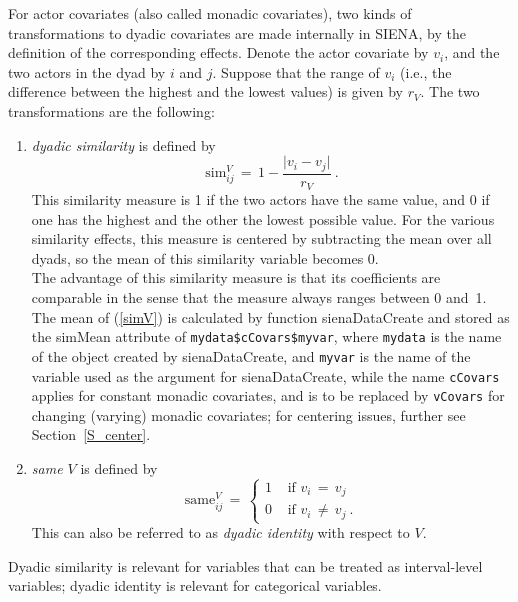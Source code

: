 \documentclass[a4paper,fleqn,11pt]{article}
\newcommand{\+}{\, + \,}
\newcommand{\sfn}[1]{\textsf{#1}}
\newcommand{\si}{{\sf SIENA}}
\begin{document}
For actor covariates (also called monadic covariates),
two kinds of transformations to dyadic covariates
are made internally in \si, by the definition of the
corresponding effects. Denote the actor covariate by $v_i$,
and the two actors in the dyad by $i$ and $j$.
Suppose that the range of $v_i$ (i.e., the difference between the
highest and the lowest values) is given by $r_V$.
The two transformations are the following:
\begin{enumerate}
\item \emph{dyadic similarity} is defined by
\begin{equation}
 \text{sim}^V_{ij} \,=\, 1 - \frac{ \vert v_i - v_j \vert }{ r_V } \ .
            \label{simV}
\end{equation}
      This similarity measure is 1 if
      the two actors have the same value, and 0 if one has the highest and the
      other the lowest possible value.
      For the various similarity effects, this measure
      is centered by subtracting the mean over all dyads,
      so the mean of this similarity variable becomes 0.    \\
      The advantage of this similarity measure is that its coefficients
      are comparable in the sense that the measure always ranges
      between 0 and~1.  \\
      The mean of (\ref{simV}) is calculated by function
      \sfn{sienaDataCreate} and stored as the \sfn{simMean} attribute
      of \texttt{mydata\$cCovars\$myvar}, where \texttt{mydata} is the name
      of the object created by \sfn{sienaDataCreate}, and \texttt{myvar}
      is the name of the variable used as the argument for
      \sfn{sienaDataCreate}, while the name \texttt{cCovars} applies for
      constant monadic covariates, and is to be replaced by \texttt{vCovars}
      for changing (varying) monadic covariates;
      for centering issues, further see Section~\ref{S_center}.
\item \emph{same $V$} is defined by
\begin{equation}
 \text{same}^V_{ij} \,=\,
        \left\{ \begin{array}{ll} 1 & \text{ if } v_i \,=\, v_j \\
                          0 & \text{ if } v_i \,\neq\, v_j \ .
    \end{array} \right.
\end{equation}
      This can also be referred to as \emph{dyadic identity}
      with respect to $V$.
\end{enumerate}
Dyadic similarity is relevant for variables that can be treated as
interval-level variables; dyadic identity is relevant for categorical variables.
\end{document}
